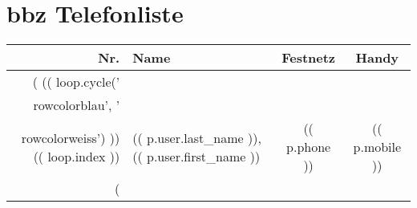 \documentclass[a4paper]{scrartcl}
\begin{document}
\sffamily

\section*{bbz Telefonliste}

\begin{longtable}{r|l|c|c}
Nr. & Name & Festnetz & Handy\\
\endhead
\hline
(%
(( loop.cycle('\\rowcolor{blau}', '\\rowcolor{weiss}') ))
(( loop.index )) & (( p.user.last_name )), (( p.user.first_name )) & (( p.phone )) & (( p.mobile ))\\
\hline
(%
\end{longtable}
\end{document}
